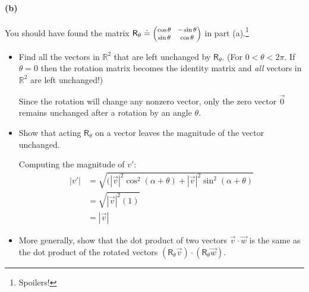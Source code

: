 \documentclass{article}
\begin{document}
\paragraph{(b)}
You should have found the matrix $\mathsf{R}_{\theta}\doteq \smmatrix{0.8}{\cos\theta&-\sin\theta\\\sin\theta&\cos\theta}$ in part (a).\footnote{Spoilers!}
	\begin{itemize}
		\item Find all the vectors in $\mathbb{R}^{2}$ that are left unchanged by $\mathsf{R}_{\theta}$. (For $0<\theta<2\pi$.  If $\theta=0$ then the rotation
		matrix becomes the identity matrix and \emph{all} vectors in $\mathbb{R}^{2}$ are left unchanged!)

			\begin{solution}
				Since the rotation will change any nonzero vector, only the zero vector $\vec 0$ remains 
				unchanged after a rotation by an angle $\theta$.
			\end{solution}
		\item Show that acting $\mathsf{R}_{\theta}$ on a vector leaves the magnitude of the vector unchanged.

			\begin{solution}
				Computing the magnitude of $v'$:
				\begin{align*}
					|v'| &= \sqrt{(|\vec v|^2 \cos^2(\alpha + \theta) + |\vec v|^2 \sin^2(\alpha + \theta)} \\
					&= \sqrt{|\vec v|^2(1)}  \\
					&= |\vec v| 
				\end{align*}
			\end{solution}
		\item More generally, show that the dot product of two vectors $\vec{v}\cdot\vec{w}$ is the same as the dot product of the rotated vectors 
		$(\mathsf{R}_{\theta}\vec{v})\cdot(\mathsf{R}_{\theta}\vec{w})$.


\end{itemize}
\end{document}
